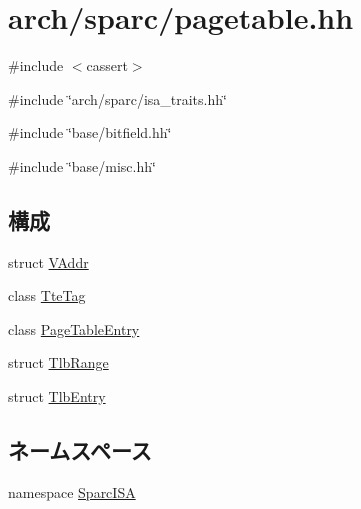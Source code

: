 \hypertarget{sparc_2pagetable_8hh}{
\section{arch/sparc/pagetable.hh}
\label{sparc_2pagetable_8hh}
}
{\ttfamily \#include $<$cassert$>$}\par
{\ttfamily \#include \char`\"{}arch/sparc/isa\_\-traits.hh\char`\"{}}\par
{\ttfamily \#include \char`\"{}base/bitfield.hh\char`\"{}}\par
{\ttfamily \#include \char`\"{}base/misc.hh\char`\"{}}\par
\subsection*{構成}
\begin{DoxyCompactItemize}
\item 
struct \hyperlink{structSparcISA_1_1VAddr}{VAddr}
\item 
class \hyperlink{classSparcISA_1_1TteTag}{TteTag}
\item 
class \hyperlink{classSparcISA_1_1PageTableEntry}{PageTableEntry}
\item 
struct \hyperlink{structSparcISA_1_1TlbRange}{TlbRange}
\item 
struct \hyperlink{structSparcISA_1_1TlbEntry}{TlbEntry}
\end{DoxyCompactItemize}
\subsection*{ネームスペース}
\begin{DoxyCompactItemize}
\item 
namespace \hyperlink{namespaceSparcISA}{SparcISA}
\end{DoxyCompactItemize}

